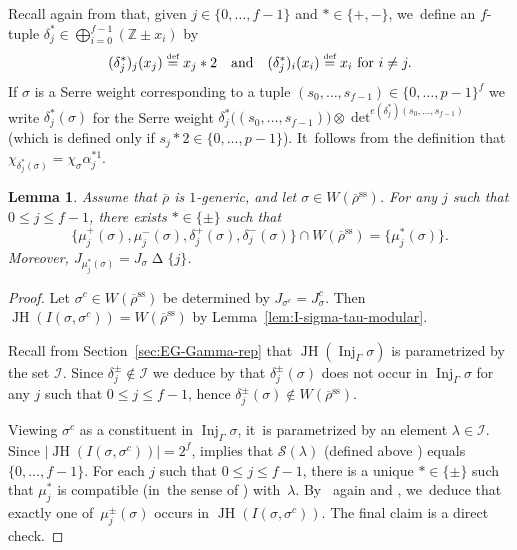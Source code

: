 \documentclass[JEP,XML,SOM,Unicode,NoFloatCountersInSection, NoEqCountersInSection,published]{cedram}
\newcommand{\quand}{\quad\text{and}\quad}
\newcommand{\defeq}{\stackrel{\textrm{\tiny{\upshape{def}}}}{=}}
\newcommand{\Z}{{\mathbb Z}}
\newcommand{\cI}{\mathcal{I}}
\newcommand{\cS}{\mathcal{S}}
\renewcommand{\ss}{\mathrm{ss}}
\newcommand{\brho}{\overline{\rho}}
\DeclareMathOperator{\Inj}{Inj}
\DeclareMathOperator{\JH}{\mathrm{JH}}
\theoremstyle{plain}
\newtheorem{lem}[prop]{Lemma}
\theoremstyle{definition}
\begin{document}
Recall again from \cite[Def.\,2.9]{HuWang2} that, given $j\in\{0,\dots,f-1\}$ and $*\in \{+,-\}$, we~define an $f$-tuple $\delta_j^*\in \bigoplus_{i=0}^{f-1}(\Z\pm x_i)$ by
\[
(\delta_j^*)_{j}(x_{j})\defeq x_{j}\ast2\quand(\delta_j^*)_{i}(x_i)\defeq x_i\text{ for }i\neq j.
\]
If $\sigma$ is a Serre weight corresponding to a tuple $(s_0,\dots,s_{f-1})\in\{0,\dots,p-1\}^f$ we write $\delta^*_j(\sigma)$ for the Serre weight $\delta_j^*\bigl((s_0,\dots,s_{f-1})\bigr)\otimes\det^{e(\delta_j^*)(s_0,\dots,s_{f-1})}$ (which is defined only if $s_j \ast 2 \in\{0,\dots,p-1\}$). It~follows from the definition that $\chi_{\delta_j^*(\sigma)}=\chi_\sigma\alpha_j^{*1}$.

\begin{lem}\label{lem:mu-pm}
Assume that $\brho$ is $1$-generic, and let $\sigma \in W(\brho^\ss)$.
For any $j$ such that $0 \le j \le f-1$, there exists $* \in \{\pm\}$ such that
\begin{equation}\label{eq:mu-pm-delta-pm}
\bigl\{\mu_j^+(\sigma), \mu_j^-(\sigma), \delta_j^+(\sigma), \delta_j^-(\sigma)\bigr\} \cap W(\brho^\ss) = \{\mu_j^*(\sigma)\}.
\end{equation}
Moreover, $J_{\mu_j^*(\sigma)} = J_\sigma \mathbin\Delta \{j\}$.
\end{lem}

\begin{proof}

Let $\sigma^c \in W(\brho^\ss)$ be determined by $J_{\sigma^c}=J_{\sigma}^c$.
Then $\JH(I(\sigma,\sigma^c)) = W(\brho^\ss)$ by Lemma~\ref{lem:I-sigma-tau-modular}.

{Recall from Section~\ref{sec:EG-Gamma-rep} that $\JH(\Inj_{\Gamma}\sigma)$ is parametrized by the set $\mathcal{I}$.}
Since $\delta_j^{\pm} \notin \cI$ we deduce by \cite[Lem.\,2.1, 2.7]{HuWang2} that $\delta_j^{\pm}(\sigma)$ does not occur in $\Inj_{\Gamma}\sigma$ for any $j$ such that $0\leq j\leq f-1$, hence $\delta_j^{\pm}(\sigma)\notin W(\brho^\ss)$.

Viewing $\sigma^c$ as a constituent in $\Inj_{\Gamma}\sigma$, it~is parametrized by an element $\lambda\in \cI$.
Since $|{\JH(I(\sigma,\sigma^c))}|=2^f$, \cite[Cor.\,4.11]{BP} implies that $\cS(\lambda)$ (defined above \cite[Lem.\,4.1.2]{BHHMS4}) equals $\{0,\dots,f-1\}$. For each $j$ such that $0\leq j\leq f-1$, there is a unique $*\in\{\pm\}$ such that $\mu_j^*$ is compatible (in~the sense of \cite[Def.\,4.10]{BP}) with~$\lambda$. By~\cite[Cor.\,4.11]{BP} again and \cite[Lem.\,2.1, 2.7]{HuWang2}, we~deduce that exactly one of~$\mu_j^{\pm}(\sigma)$ occurs in $\JH(I(\sigma,\sigma^c))$. The final claim is a direct check.
\end{proof}
\end{document}
